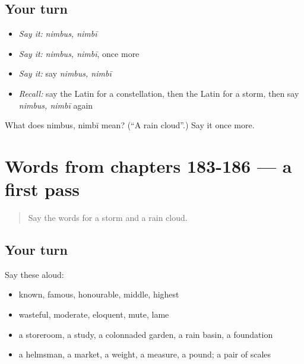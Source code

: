 \subsection*{Your turn}
\begin{itemize}
\raggedright
  \item \emph{Say it:} \emph{nimbus, nimbī}
  \item \emph{Say it:} \emph{nimbus, nimbī}, once more
  \item \emph{Say it:} say \emph{nimbus, nimbī}
  \item \emph{Recall:} say the Latin for a constellation, then the Latin for a storm, then say \emph{nimbus, nimbī} again
\end{itemize}

\begin{tcolorbox}[breakable,colback=teal!4,colframe=teal!35!black,title={Before you move on}]
What does nimbus, nimbī mean? (\textquotedblleft{}A rain cloud\textquotedblright{}.) Say it once more.
\end{tcolorbox}
\section[(dialogue)]{Words from chapters 183-186 — a first pass}

\label{lesson:LA-R191-first-pass-words-from-chapters-183-186}



\begin{quote}
Say the words for a storm and a rain cloud.
\end{quote}

\subsection*{Your turn}
Say these aloud:

\begin{itemize}
\raggedright
  \item known, famous, honourable, middle, highest
  \item wasteful, moderate, eloquent, mute, lame
  \item a storeroom, a study, a colonnaded garden, a rain basin, a foundation
  \item a helmsman, a market, a weight, a measure, a pound; a pair of scales
\end{itemize}

